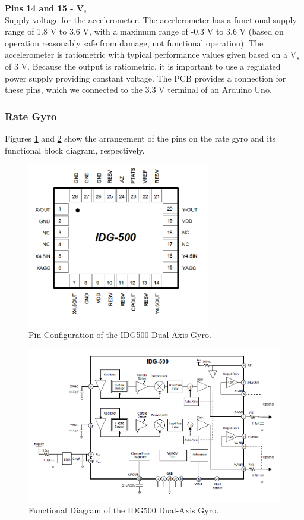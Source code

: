 \documentclass{article}
\theoremstyle{plain}
\theoremstyle{definition}
\theoremstyle{remark}
\begin{document}
\textbf{Pins 14 and 15 - V$_s$}\\
Supply voltage for the accelerometer. The accelerometer has a functional supply range of 1.8 V to 3.6 V, with a maximum range of -0.3 V to 3.6 V (based on operation reasonably safe from damage, not functional operation). The accelerometer is ratiometric with typical performance values given based on a V$_s$ of 3 V. Because the output is ratiometric, it is important to use a regulated power supply providing constant voltage. The PCB provides a connection for these pins, which we connected to the 3.3 V terminal of an Arduino Uno.\\ 

\subsubsection{Rate Gyro}
Figures \ref{gyroPins} and \ref{gyroFunc} show the arrangement of the pins on the rate gyro and its functional block diagram, respectively. \\

\begin{figure}[hbt]
\begin{center}
\includegraphics[width = 8cm]{IDG500Pins.png}
\caption{Pin Configuration of the IDG500 Dual-Axis Gyro.}
\label{gyroPins}
\end{center}
\end{figure}

\begin{figure}[hbt]
\begin{center}
\includegraphics[width = 16cm]{IDG500Functional.png}
\caption{Functional Diagram of the IDG500 Dual-Axis Gyro.}
\label{gyroFunc}
\end{center}
\end{figure}
\end{document}
